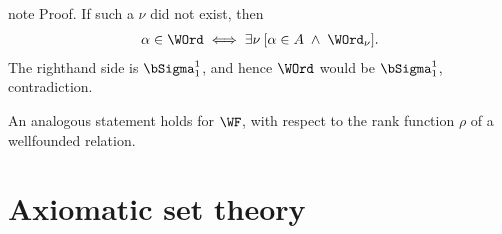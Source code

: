 \documentclass[letterpaper,10pt,english]{jupyterBook}
\begin{document}
\begin{sphinxadmonition}{note}
\sphinxAtStartPar
Proof. If such a \(\nu\) did not exist, then
\begin{equation*}
\begin{split}
	\alpha \in \WOrd \iff \exists \nu \: [\alpha \in A \; \wedge \; \WOrd_\nu].
\end{split}
\end{equation*}
\sphinxAtStartPar
The right\sphinxhyphen{}hand side is \(\bSigma^1_1\), and hence \(\WOrd\) would be \(\bSigma^1_1\), contradiction.
\end{sphinxadmonition}

\sphinxAtStartPar
An analogous statement holds for \(\WF\), with respect to the rank function \(\rho\) of a well\sphinxhyphen{}founded relation.



\sphinxstepscope


\part{Axiomatic set theory}

\sphinxstepscope
\end{document}
